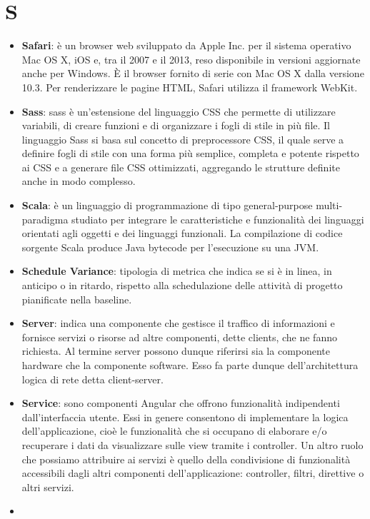 \section{S}
\begin{itemize} 
	\item
	\textbf{Safari}: è un browser web sviluppato da Apple Inc. per il sistema operativo Mac OS X, iOS e, tra il 2007 e il 2013, reso disponibile in versioni aggiornate anche per Windows. È il browser fornito di serie con Mac OS X dalla versione 10.3. Per renderizzare le pagine HTML, Safari utilizza il framework WebKit.
	\item
	\textbf{Sass}: sass è un'estensione del linguaggio CSS che permette di utilizzare variabili, di creare funzioni e di organizzare i fogli di stile in più file. Il linguaggio Sass si basa sul concetto di preprocessore CSS, il quale serve a definire fogli di stile con una forma più semplice, completa e potente rispetto ai CSS e a generare file CSS ottimizzati, aggregando le strutture definite anche in modo complesso.
	\item
	\textbf{Scala}: è un linguaggio di programmazione di tipo general-purpose multi-paradigma studiato per integrare le caratteristiche e funzionalità dei linguaggi orientati agli oggetti e dei linguaggi funzionali. La compilazione di codice sorgente Scala produce Java bytecode per l'esecuzione su una JVM.
	\item
	\textbf{Schedule Variance}: tipologia di metrica che indica se si è in linea, in anticipo o in ritardo, rispetto alla schedulazione delle attività di progetto pianificate nella baseline.
	\item
	\textbf{Server}: indica una componente che gestisce il traffico di informazioni e fornisce servizi o risorse ad altre componenti, dette clients, che ne fanno richiesta. Al termine server possono dunque riferirsi sia la componente hardware che la componente software. Esso fa parte dunque dell'architettura logica di rete detta client-server.
	\item
	\textbf{Service}: sono componenti Angular che offrono funzionalità indipendenti dall’interfaccia utente. Essi in genere consentono di implementare la logica dell’applicazione, cioè le funzionalità che si occupano di elaborare e/o recuperare i dati da visualizzare sulle view tramite i controller.
	Un altro ruolo che possiamo attribuire ai servizi è quello della condivisione di funzionalità accessibili dagli altri componenti dell’applicazione: controller, filtri, direttive o altri servizi.
	\item 

\end{itemize}
